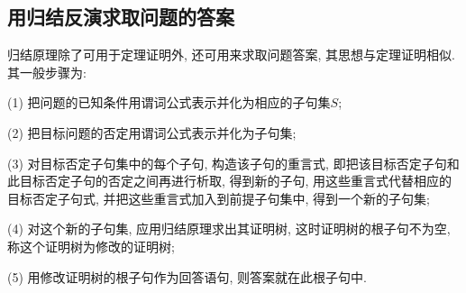 \subsection{用归结反演求取问题的答案}
归结原理除了可用于定理证明外, 还可用来求取问题答案, 其思想与定理证明相似. 其一般步骤为:

(1) 把问题的已知条件用谓词公式表示并化为相应的子句集$S$;

(2) 把目标问题的否定用谓词公式表示并化为子句集;

(3) 对目标否定子句集中的每个子句, 构造该子句的重言式, 即把该目标否定子句和此目标否定子句的否定之间再进行析取, 得到新的子句, 用这些重言式代替相应的目标否定子句式, 并把这些重言式加入到前提子句集中, 得到一个新的子句集;

(4) 对这个新的子句集, 应用归结原理求出其证明树, 这时证明树的根子句不为空, 称这个证明树为修改的证明树;

(5) 用修改证明树的根子句作为回答语句, 则答案就在此根子句中.

